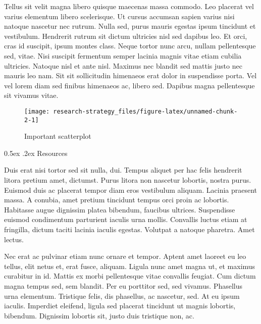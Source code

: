 \documentclass[11pt,]{article}
\makeatletter
\renewcommand\subsubsection{
  \@startsection{subsubsection}{3}{\z@}
    {-1.0ex\@plus -1ex \@minus -.2ex}%
    {0.5ex \@plus .2ex}%
    {\normalfont\normalsize\bf}} %
\makeatother
\begin{document}
Tellus sit velit magna libero quisque maecenas massa commodo. Leo
placerat vel varius elementum libero scelerisque. Ut cursus accumsan
sapien varius nisi natoque nascetur nec rutrum. Nulla sed, purus mauris
egestas ipsum tincidunt et vestibulum. Hendrerit rutrum sit dictum
ultricies nisl sed dapibus leo. Et orci, cras id suscipit, ipsum montes
class. Neque tortor nunc arcu, nullam pellentesque sed, vitae. Nisi
suscipit fermentum semper lacinia magnis vitae etiam cubilia ultricies.
Natoque nisl et ante nisl. Maximus nec blandit sed mattis justo nec
mauris leo nam. Sit sit sollicitudin himenaeos erat dolor in suspendisse
porta. Vel vel lorem diam sed finibus himenaeos ac, libero sed. Dapibus
magna pellentesque sit vivamus vitae.

\begin{wrapfigure}{R}{0.3\textwidth}

\hfill{}\texttt{[image: research-strategy\_files/figure-latex/unnamed-chunk-2-1]} 

\caption{Important scatterplot}\label{fig:unnamed-chunk-2}
\end{wrapfigure}

\hypertarget{resources}{%
\subsubsection{Resources}\label{resources}}

Duis erat nisi tortor sed sit nulla, dui. Tempus aliquet per hac felis
hendrerit litora pretium amet, dictumst. Purus litora non nascetur
lobortis, nostra purus. Euismod duis ac placerat tempor diam eros
vestibulum aliquam. Lacinia praesent massa. A conubia, amet pretium
tincidunt tempus orci proin ac lobortis. Habitasse augue dignissim
platea bibendum, faucibus ultrices. Suspendisse euismod condimentum
parturient iaculis urna mollis. Convallis luctus etiam at fringilla,
dictum taciti lacinia iaculis egestas. Volutpat a natoque pharetra. Amet
lectus.

Nec erat ac pulvinar etiam nunc ornare et tempor. Aptent amet laoreet eu
leo tellus, elit netus et, erat fusce, aliquam. Ligula nunc amet magna
ut, et maximus curabitur in id. Mattis ex morbi pellentesque vitae
convallis feugiat. Cum dictum magna tempus sed, sem blandit. Per eu
porttitor sed, sed vivamus. Phasellus urna elementum. Tristique felis,
dis phasellus, ac nascetur, sed. At eu ipsum iaculis. Imperdiet
eleifend, ligula sed placerat tincidunt ut magnis lobortis, bibendum.
Dignissim lobortis sit, justo duis tristique non, ac.
\end{document}
